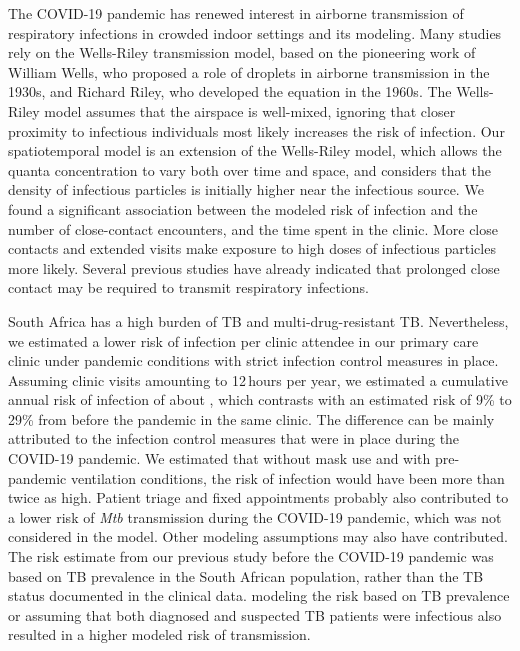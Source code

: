 \documentclass[fleqn,11pt]{wlscirep}
\begin{document}
The COVID-19 pandemic has renewed interest in airborne transmission of respiratory infections in crowded indoor settings\cite{Wang2021Science,Morawska2021,Greenhalgh2022BMJ} and its modeling\cite{Shen2021STBE,Buonanno2020EI,Edwards2024RiskAnalysis}. Many studies\cite{Andrews2014JID,Taylor2016IJTLD,Hella2017JInfect,Zemouri2020JDR} rely on the Wells-Riley transmission model\cite{Riley1961Book}, based on the pioneering work of William Wells, who proposed a role of droplets in airborne transmission in the 1930s\cite{Wells1934AJE}, and Richard Riley, who developed the equation in the 1960s\cite{Riley1961Book}.  The Wells-Riley model assumes that the airspace is well-mixed, ignoring that closer proximity to infectious individuals most likely increases the risk of infection. Our spatiotemporal model is an extension of the Wells-Riley model, which allows the quanta concentration to vary both over time and space, and considers that the density of infectious particles is initially higher near the infectious source\cite{Wang2021Science,Vuorinen2020SafSci,Chen2020BuildEnv}. We found a significant association between the modeled risk of infection and the number of close-contact encounters, and the time spent in the clinic. More close contacts and extended visits make exposure to high doses of infectious particles more likely. Several previous studies have already indicated that prolonged close contact may be required to transmit respiratory infections\cite{Leung2020NatMed,Brankston2007LancetID,Narasimhan2013PulmonaryMed}. 

South Africa has a high burden of TB and multi-drug-resistant TB\cite{WHO2023TBReport}. Nevertheless, we estimated a lower risk of infection per clinic attendee in our primary care clinic under pandemic conditions with strict infection control measures in place. Assuming clinic visits amounting to 12\,hours per year, we estimated a cumulative annual risk of infection of about , which contrasts with an estimated risk of 9\% to 29\% from before the pandemic in the same clinic\cite{Zurcher2022JID}. The difference can be mainly attributed to the infection control measures that were in place during the COVID-19 pandemic. We estimated that without mask use and with pre-pandemic ventilation conditions, the risk of infection would have been more than twice as high. Patient triage and fixed appointments probably also contributed to a lower risk of \emph{Mtb} transmission during the COVID-19 pandemic, which was not considered in the model. Other modeling assumptions may also have contributed. The risk estimate from our previous study before the COVID-19 pandemic\cite{Zurcher2022JID} was based on TB prevalence in the South African population, rather than the TB status documented in the clinical data. modeling the risk based on TB prevalence or assuming that both diagnosed and suspected TB patients were infectious also resulted in a higher modeled risk of transmission. 
\end{document}
